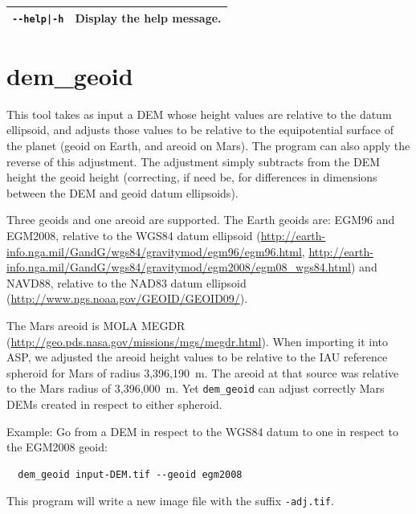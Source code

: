 \begin{longtable}{|l|p{10cm}|}
\texttt{-\/-help|-h} & Display the help message.
\\ \hline

\end{longtable}

\clearpage


\section{dem\_geoid}
\label{demgeoid}

This tool takes as input a \ac{DEM} whose height values are relative to the
datum ellipsoid, and adjusts those values to be relative to the
equipotential surface of the planet (geoid on Earth, and areoid on
Mars). The program can also apply the reverse of this adjustment. The
adjustment simply subtracts from the DEM height the geoid height
(correcting, if need be, for differences in dimensions between the DEM
and geoid datum ellipsoids).

Three geoids and one areoid are supported. The Earth geoids are: EGM96
and EGM2008, relative to the WGS84 datum ellipsoid
(\url{http://earth-info.nga.mil/GandG/wgs84/gravitymod/egm96/egm96.html},
\url{http://earth-info.nga.mil/GandG/wgs84/gravitymod/egm2008/egm08_wgs84.html})
and NAVD88, relative to the NAD83 datum ellipsoid
(\url{http://www.ngs.noaa.gov/GEOID/GEOID09/}).

The Mars areoid is MOLA MEGDR
(\url{http://geo.pds.nasa.gov/missions/mgs/megdr.html}). When importing
it into ASP, we adjusted the areoid height values to be relative to
the IAU reference spheroid for Mars of radius 3,396,190~m. The areoid at that source was
relative to the Mars radius of 3,396,000~m. Yet \texttt{dem\_geoid} can adjust
correctly Mars DEMs created in respect to either spheroid.

Example: Go from a DEM in respect to the WGS84 datum to one in respect to the EGM2008 geoid:
\begin{verbatim}
  dem_geoid input-DEM.tif --geoid egm2008
\end{verbatim}
This program will write a new image file with the suffix {\tt *-adj.tif}.

